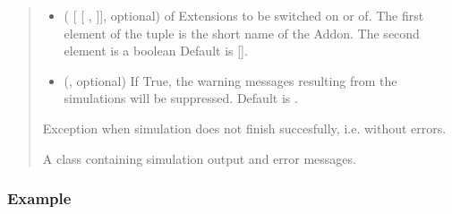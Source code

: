 \documentclass[letterpaper,10pt,english]{sphinxmanual}
\begin{document}
\begin{fulllineitems}
\begin{fulllineitems}
\begin{quote}
\begin{description}
\begin{itemize}
\item {} 
\sphinxAtStartPar
{} ( {[}  {[} ,  {]}{]}, optional) \textendash{}  of Extensions to be switched on or of. The first element of the tuple is the short name of the Addon.
The second element is a boolean Default is {[}{]}.

\item {} 
\sphinxAtStartPar
{} (, optional) \textendash{} If True, the warning messages resulting from the simulations will be suppressed. Default is .

\end{itemize}

\sphinxAtStartPar
{} \textendash{} Exception when simulation does not finish succesfully, i.e. without errors.

\sphinxAtStartPar
A class containing simulation output and error messages.

\sphinxAtStartPar
{\hyperref[\detokenize{autoapi/euromod/core/index:euromod.core.Simulation}]{}}

\end{description}\end{quote}
\subsubsection*{Example}


\end{fulllineitems}
\end{fulllineitems}
\end{document}
